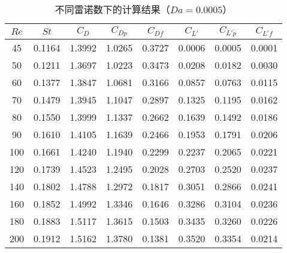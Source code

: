 \begin{table}
	\caption{不同雷诺数下的计算结果（$Da=0.0005$）}\label{tab: results-5e-4}
	\vspace{.2em}\centering\wuhao
	\begin{tabular}{*{8}{c}}
		\toprule[1.5pt]
		$Re$ & $St$ & $C_D$ & $C_{Dp}$ & $C_{Df}$ & $C_{L'}$ & $C_{L'p}$ & $C_{L'f}$ \\
		\midrule[1pt]
		45  & 0.1164 & 1.3992 & 1.0265 & 0.3727 & 0.0006 & 0.0005 & 0.0001 \\
		50	& 0.1211 & 1.3697 & 1.0223 & 0.3473 & 0.0208 & 0.0182 & 0.0030 \\
		60	& 0.1377 & 1.3847 & 1.0681 & 0.3166 & 0.0857 & 0.0763 & 0.0115 \\
		70	& 0.1479 & 1.3945 &	1.1047 & 0.2897 & 0.1325 & 0.1195 & 0.0162 \\
		80	& 0.1550 & 1.3999 &	1.1337 & 0.2662 & 0.1639 & 0.1492 &	0.0186 \\
		90	& 0.1610 & 1.4105 &	1.1639 & 0.2466 & 0.1953 & 0.1791 &	0.0206 \\
		100	& 0.1661 & 1.4240 &	1.1940 & 0.2299 & 0.2237 & 0.2065 &	0.0221 \\
		120	& 0.1739 & 1.4523 &	1.2495 & 0.2028 & 0.2703 & 0.2520 &	0.0237 \\
		140	& 0.1802 & 1.4788 &	1.2972 & 0.1817 & 0.3051 & 0.2866 &	0.0241 \\
		160	& 0.1852 & 1.4992 &	1.3346 & 0.1646 & 0.3286 & 0.3104 &	0.0236 \\
		180	& 0.1883 & 1.5117 &	1.3615 & 0.1503 & 0.3435 & 0.3260 &	0.0226 \\
		200 & 0.1912 & 1.5162 &	1.3780 & 0.1381 & 0.3520 & 0.3354 &	0.0214 \\
		\bottomrule[1.5pt]
	\end{tabular}
\end{table}

